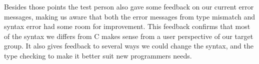 Besides those points the test person also gave some feedback on our current error messages, making us aware that both the error messages from type mismatch and syntax error had some room for improvement.
This feedback confirms that most of the syntax we differs from C makes sense from a user perspective of our target group. It also gives feedback to several ways we could change the syntax, and the type checking to make it better suit new programmers needs.  









